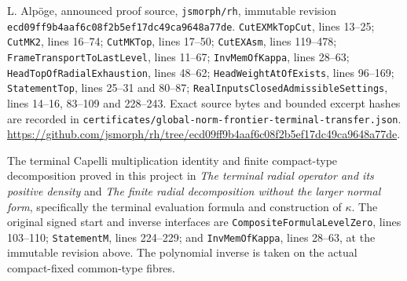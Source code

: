 L. Alp\"oge, announced proof source, \texttt{jsmorph/rh}, immutable
revision \texttt{ecd09ff9b4aaf6c08f2b5ef17dc49ca9648a77de}.
\texttt{CutEXMkTopCut}, lines 13--25;
\texttt{CutMK2}, lines 16--74;
\texttt{CutMKTop}, lines 17--50;
\texttt{CutEXAsm}, lines 119--478;
\texttt{FrameTransportToLastLevel}, lines 11--67;
\texttt{InvMemOfKappa}, lines 28--63;
\texttt{HeadTopOfRadialExhaustion}, lines 48--62;
\texttt{HeadWeightAtOfExists}, lines 96--169;
\texttt{StatementTop}, lines 25--31 and 80--87;
\texttt{RealInputsClosedAdmissibleSettings}, lines 14--16,
83--109 and 228--243.
Exact source bytes and bounded excerpt hashes are recorded in
\texttt{certificates/global-norm-frontier-terminal-transfer.json}.
\url{https://github.com/jsmorph/rh/tree/ecd09ff9b4aaf6c08f2b5ef17dc49ca9648a77de}.

The terminal Capelli multiplication identity and finite compact-type
decomposition proved in this project in
\emph{The terminal radial operator and its positive density} and
\emph{The finite radial decomposition without the larger normal form},
specifically the terminal evaluation formula and construction of
$\kappa$.  The original signed start and inverse interfaces are
\texttt{CompositeFormulaLevelZero}, lines 103--110;
\texttt{StatementM}, lines 224--229;
and \texttt{InvMemOfKappa}, lines 28--63, at the immutable revision
above.  The polynomial inverse is taken on the actual compact-fixed
common-type fibres.
